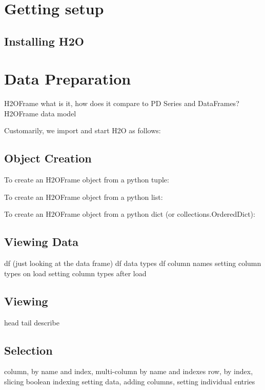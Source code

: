 \section{Getting setup}

\subsection{Installing H2O}
\newcommand{\waterVersion}{3.2.0.5}


\section{Data Preparation}
H2OFrame what is it, how does it compare to PD Series and DataFrames?
H2OFrame data model

\waterExampleInPython
Customarily, we import and start H2O as follows:


\subsection{Object Creation}

\waterExampleInPython
To create an H2OFrame object from a python tuple:


\waterExampleInPython
To create an H2OFrame object from a python list:


\waterExampleInPython
To create an H2OFrame object from a python dict (or collections.OrderedDict):


\subsection{Viewing Data}
df (just looking at the data frame)
df data types
df column names
setting column types on load
setting column types after load

\subsection{Viewing}
head
tail
describe

\subsection{Selection}
column, by name and index, multi-column by name and indexes
row, by index, slicing
boolean indexing
setting data, adding columns, setting individual entries

